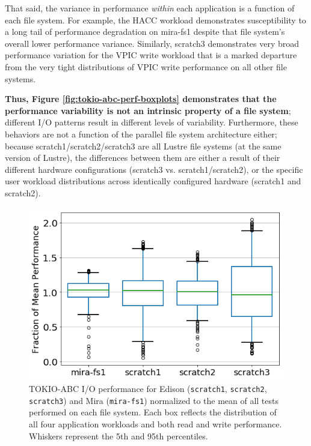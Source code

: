 \documentclass[conference,10pt,compsocconf]{IEEEtran}
\begin{document}
That said, the variance in performance \emph{within} each application is a
function of each file system.  For example, the HACC workload demonstrates
susceptibility to a long tail of performance degradation on mira-fs1 despite
that file system's overall lower performance variance.  Similarly, scratch3
demonstrates very broad performance variation for the VPIC write workload that
is a marked departure from the very tight distributions of VPIC write
performance on all other file systems.

\textbf{Thus, Figure \ref{fig:tokio-abc-perf-boxplots} demonstrates that the
performance variability is not an intrinsic property of a file system};
different I/O patterns result in different levels of variability.  Furthermore,
these behaviors are not a function of the parallel file system architecture
either; because scratch1/scratch2/scratch3 are all Lustre file systems (at the
same version of Lustre), the differences between them are either a result of
their different hardware configurations (scratch3 vs. scratch1/scratch2), or
the specific user workload distributions across identically configured hardware
(scratch1 and scratch2).

\begin{figure}[t]
\centering
\includegraphics[width=1.0\columnwidth]{figs/perf-boxplots-per-fs.png}
\caption{TOKIO-ABC I/O performance for Edison (\texttt{scratch1},
\texttt{scratch2}, \texttt{scratch3}) and Mira (\texttt{mira-fs1}) normalized to
the mean of all tests performed on each file system.  Each box reflects the
distribution of all four application workloads and both read and write
performance. Whiskers represent the 5th and 95th percentiles.}
\label{fig:perf-summary-boxplots-fs}
\end{figure}
\end{document}
